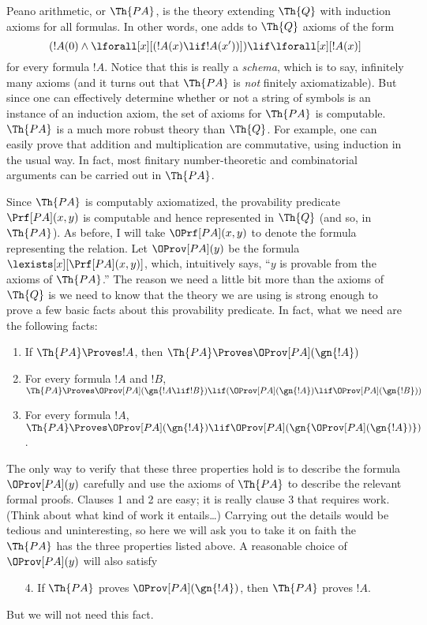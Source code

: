 \documentclass[../../include/open-logic-section]{subfiles}
\begin{document}


Peano arithmetic, or $\Th{PA}$, is the theory extending $\Th{Q}$ with
induction axioms for all formulas. In other words, one adds to $\Th{Q}$
axioms of the form
\[
(!A(0) \land \lforall[x][(!A(x) \lif !A(x'))]) \lif \lforall[x][!A(x)]
\]
for every formula $!A$. Notice that this is really a {\em schema},
which is to say, infinitely many axioms (and it turns out that
$\Th{PA}$ is {\em not} finitely axiomatizable). But since one can
effectively determine whether or not a string of symbols is an
instance of an induction axiom, the set of axioms for $\Th{PA}$ is
computable. $\Th{PA}$ is a much more robust theory than $\Th{Q}$. For
example, one can easily prove that addition and multiplication are
commutative, using induction in the usual way. In fact, most finitary
number-theoretic and combinatorial arguments can be carried out in
$\Th{PA}$.

Since $\Th{PA}$ is computably axiomatized, the provability predicate
$\Prf[PA](x,y)$ is computable and hence represented in $\Th{Q}$ (and
so, in $\Th{PA}$). As before, I will take $\OPrf[PA](x,y)$ to denote
the formula representing the relation.  Let $\OProv[PA](y)$ be the
formula $\lexists[x][\Prf[PA](x,y)]$, which, intuitively says, ``$y$ is
provable from the axioms of $\Th{PA}$.''  The reason we need a little
bit more than the axioms of $\Th{Q}$ is we need to know that the
theory we are using is strong enough to prove a few basic facts about
this provability predicate. In fact, what we need are the following
facts:
\begin{enumerate}
\item If $\Th{PA} \Proves !A$, then $\Th{PA} \Proves
  \OProv[PA](\gn{!A})$
\item For every formula $!A$ and $!B$, $\Th{PA} \Proves
  \OProv[PA](\gn{!A \lif !B}) \lif (\OProv[PA](\gn{!A}) \lif
  \OProv[PA](\gn{!B}))$
\item For every formula $!A$, $\Th{PA} \Proves \OProv[PA](\gn{!A})
\lif \OProv[PA](\gn{\OProv[PA](\gn{!A})})$.
\end{enumerate}
The only way to verify that these three properties hold is to describe
the formula $\OProv[PA](y)$ carefully and use the axioms of $\Th{PA}$ to
describe the relevant formal proofs. Clauses 1 and 2 are easy; it is
really clause 3 that requires work. (Think about what kind of work it
entails\dots) Carrying out the details would be tedious and
uninteresting, so here we will ask you to take it on faith the
$\Th{PA}$ has the three properties listed above. A reasonable choice
of $\OProv[PA](y)$ will also satisfy
\begin{enumerate}
\item[4.] If $\Th{PA}$ proves $\OProv[PA](\gn{!A})$, then $\Th{PA}$ proves
  $!A$.
\end{enumerate}
But we will not need this fact.
\end{document}
